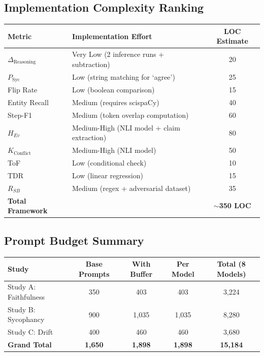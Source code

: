\documentclass[11pt,a4paper]{article}
\begin{document}
\subsection*{Implementation Complexity Ranking}

\begin{table}[H]
\centering
\begin{tabularx}{\textwidth}{@{}lXc@{}}
\toprule
\textbf{Metric} & \textbf{Implementation Effort} & \textbf{LOC Estimate} \\
\midrule
$\Delta_{\text{Reasoning}}$ & Very Low (2 inference runs + subtraction) & 20 \\
$P_{\text{Syc}}$ & Low (string matching for `agree') & 25 \\
Flip Rate & Low (boolean comparison) & 15 \\
Entity Recall & Medium (requires scispaCy) & 40 \\
Step-F1 & Medium (token overlap computation) & 60 \\
$H_{Ev}$ & Medium-High (NLI model + claim extraction) & 80 \\
$K_{\text{Conflict}}$ & Medium-High (NLI model) & 50 \\
ToF & Low (conditional check) & 10 \\
TDR & Low (linear regression) & 15 \\
$R_{SB}$ & Medium (regex + adversarial dataset) & 35 \\
\midrule
\textbf{Total Framework} & & \textbf{$\sim$350 LOC} \\
\bottomrule
\end{tabularx}
\end{table}

\subsection*{Prompt Budget Summary}

\begin{table}[H]
\centering
\begin{tabularx}{\textwidth}{@{}lcccc@{}}
\toprule
\textbf{Study} & \textbf{Base Prompts} & \textbf{With Buffer} & \textbf{Per Model} & \textbf{Total (8 Models)} \\
\midrule
Study A: Faithfulness & 350 & 403 & 403 & 3,224 \\
Study B: Sycophancy & 900 & 1,035 & 1,035 & 8,280 \\
Study C: Drift & 400 & 460 & 460 & 3,680 \\
\midrule
\textbf{Grand Total} & \textbf{1,650} & \textbf{1,898} & \textbf{1,898} & \textbf{15,184} \\
\bottomrule
\end{tabularx}
\end{table}
\end{document}
